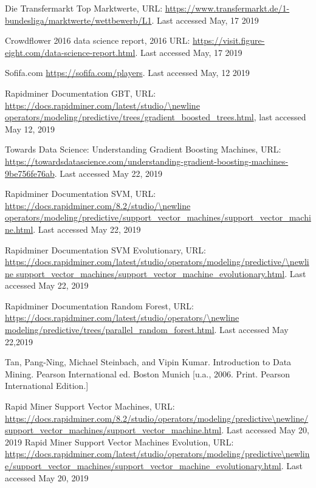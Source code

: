 \documentclass[runningheads]{llncs}
\begin{document}


%
\begin{thebibliography}{8}

Die Transfermarkt Top Marktwerte, URL: \url{https://www.transfermarkt.de/1-bundesliga/marktwerte/wettbewerb/L1}. Last accessed May, 17 2019

Crowdflower 2016 data science report, 2016   URL: \url{https://visit.figure-eight.com/data-science-report.html}. Last accessed May, 17 2019

Sofifa.com \url{https://sofifa.com/players}. Last accessed May, 12 2019

Rapidminer Documentation GBT, URL: \url{https://docs.rapidminer.com/latest/studio/\newline operators/modeling/predictive/trees/gradient\_boosted\_trees.html}, last accessed May 12, 2019


Towards Data Science: Understanding Gradient Boosting Machines, URL:  \url{https://towardsdatascience.com/understanding-gradient-boosting-machines-9be756fe76ab}. Last accessed May 22, 2019

Rapidminer Documentation SVM, URL: \url{https://docs.rapidminer.com/8.2/studio/\newline operators/modeling/predictive/support\_vector\_machines/support\_vector\_machine.html}. Last accessed May 22, 2019

Rapidminer Documentation SVM Evolutionary, URL: \url{https://docs.rapidminer.com/latest/studio/operators/modeling/predictive/\newline support\_vector\_machines/support\_vector\_machine\_evolutionary.html}. Last accessed May 22, 2019

Rapidminer Documentation Random Forest, URL: \url{https://docs.rapidminer.com/latest/studio/operators/\newline modeling/predictive/trees/parallel\_random\_forest.html}. Last accessed May 22,2019

Tan, Pang-Ning, Michael Steinbach, and Vipin Kumar. Introduction to Data Mining. Pearson International ed. Boston Munich [u.a., 2006. Print. Pearson International Edition.]

Rapid Miner Support Vector Machines, URL: \url{https://docs.rapidminer.com/8.2/studio/operators/modeling/predictive\newline/support\_vector\_machines/support\_vector\_machine.html}. Last accessed May 20, 2019
%
Rapid Miner Support Vector Machines Evolution, URL: \url{https://docs.rapidminer.com/latest/studio/operators/modeling/predictive\newline/support\_vector\_machines/support\_vector\_machine\_evolutionary.html}. Last accessed May 20, 2019





\end{thebibliography}
\end{document}
